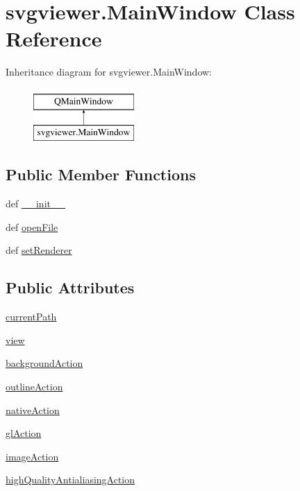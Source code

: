 \hypertarget{classsvgviewer_1_1MainWindow}{}\section{svgviewer.\+Main\+Window Class Reference}
\label{classsvgviewer_1_1MainWindow}
Inheritance diagram for svgviewer.\+Main\+Window\+:\begin{figure}[H]
\begin{center}
\leavevmode
\includegraphics[height=2.000000cm]{classsvgviewer_1_1MainWindow}
\end{center}
\end{figure}
\subsection*{Public Member Functions}
\begin{DoxyCompactItemize}
\item 
def \hyperlink{classsvgviewer_1_1MainWindow_af5289516198c1209b91d4877ddd76a49}{\+\_\+\+\_\+init\+\_\+\+\_\+}
\item 
def \hyperlink{classsvgviewer_1_1MainWindow_a9dd9d1ac726bf3189233bb251da887c0}{open\+File}
\item 
def \hyperlink{classsvgviewer_1_1MainWindow_aae3797350dc5e63358ecfa062b093497}{set\+Renderer}
\end{DoxyCompactItemize}
\subsection*{Public Attributes}
\begin{DoxyCompactItemize}
\item 
\hyperlink{classsvgviewer_1_1MainWindow_a485646b7302eded13d016499f6908829}{current\+Path}
\item 
\hyperlink{classsvgviewer_1_1MainWindow_af4473a7b451e42396df79daf3158449b}{view}
\item 
\hyperlink{classsvgviewer_1_1MainWindow_a31a6acc72ffe6120aff8b3cacecd901c}{background\+Action}
\item 
\hyperlink{classsvgviewer_1_1MainWindow_a4f7efeb7a9f9eda4475fe320edce546e}{outline\+Action}
\item 
\hyperlink{classsvgviewer_1_1MainWindow_a35aa36b98ed3a8a656a6177a0f7b61fc}{native\+Action}
\item 
\hyperlink{classsvgviewer_1_1MainWindow_a5270a8c42dd518d5b134bb0704b133d3}{gl\+Action}
\item 
\hyperlink{classsvgviewer_1_1MainWindow_aae0449e623a5d4addc0353bad2855acb}{image\+Action}
\item 
\hyperlink{classsvgviewer_1_1MainWindow_a5f3b3499d68f6983a02d206e3daad2c0}{high\+Quality\+Antialiasing\+Action}
\end{DoxyCompactItemize}


